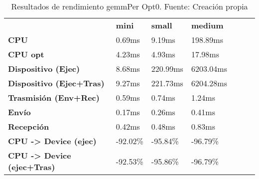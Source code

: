 \begin{table}[H]
    \centering
    \begin{tabular}{lllllll}
    \rowcolor[HTML]{DAE8FC} \ &  \textbf{mini} &  \textbf{	small} &  \textbf{	medium} \\
    \cellcolor[HTML]{DAE8FC} \textbf{CPU} & 0.69ms & 	9.19ms & 	198.89ms \\
    \rowcolor[HTML]{EFEFEF} \cellcolor[HTML]{DAE8FC} \textbf{CPU opt} & 4.23ms & 	4.93ms & 	17.98ms \\
    \cellcolor[HTML]{DAE8FC} \textbf{Dispositivo (Ejec)} & 8.68ms & 	220.99ms & 	6203.04ms \\
    \rowcolor[HTML]{EFEFEF} \cellcolor[HTML]{DAE8FC} \textbf{Dispositivo (Ejec+Tras)} & 9.27ms & 	221.73ms & 	6204.28ms \\
    \cellcolor[HTML]{DAE8FC} \textbf{Trasmisión (Env+Rec)} & 0.59ms & 	0.74ms & 	1.24ms \\
    \rowcolor[HTML]{EFEFEF} \cellcolor[HTML]{DAE8FC} \textbf{Envío} & 0.17ms & 	0.26ms & 	0.41ms \\
    \cellcolor[HTML]{DAE8FC} \textbf{Recepción} & 0.42ms & 	0.48ms & 	0.83ms \\
    \rowcolor[HTML]{EFEFEF} \cellcolor[HTML]{DAE8FC} \textbf{CPU -> Device (ejec)} & -92.02\% & 	-95.84\% & 	-96.79\% \\
    \cellcolor[HTML]{DAE8FC} \textbf{CPU -> Device (ejec+Tras)} & -92.53\% & 	-95.86\% & 	-96.79\% \\
    \end{tabular}
    \caption[Resultados de rendimiento gemmPer Opt0]{{Resultados de rendimiento gemmPer Opt0. Fuente: Creación propia}}
    \label{table_test_gemmPer_Opt0_hw_performanceResults}
\end{table}